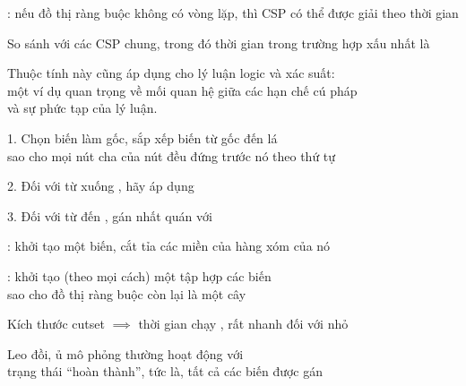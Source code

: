 \documentclass{article}
\begin{document}
\begin{huge}
: nếu đồ thị ràng buộc không có vòng lặp, thì CSP có thể được giải theo 
 thời gian

So sánh với các CSP chung, trong đó thời gian trong trường hợp xấu nhất là 

Thuộc tính này cũng áp dụng cho lý luận logic và xác suất:\\
một ví dụ quan trọng về mối quan hệ giữa các hạn chế cú pháp\\
và sự phức tạp của lý luận.




1. Chọn biến làm gốc, sắp xếp biến từ gốc đến lá\\
sao cho mọi nút cha của nút đều đứng trước nó theo thứ tự 

\vspace*{0.2in}

\textwidth
{}

2. Đối với  từ  xuống , hãy áp dụng 

3. Đối với  từ  đến , gán  nhất quán với 


: khởi tạo một biến, cắt tỉa các miền của hàng xóm của nó

\vspace*{0.2in}

\textwidth
{}



: khởi tạo (theo mọi cách) một tập hợp các biến\\ 
sao cho đồ thị ràng buộc còn lại là một cây

Kích thước cutset  $\implies$ thời gian chạy , rất nhanh đối với  nhỏ




Leo đồi, ủ mô phỏng thường hoạt động với \\
trạng thái ``hoàn thành'', tức là, tất cả các biến được gán


\end{huge}
\end{document}
